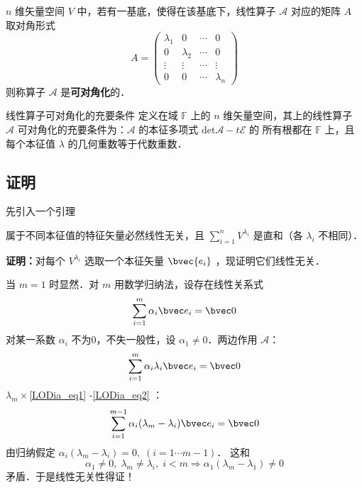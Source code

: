 \begin{definition}{}
 $n$ 维矢量空间 $V$ 中，若有一基底，使得在该基底下，线性算子 $\mathcal{A}$ 对应的矩阵 $A$ 取对角形式
 \begin{equation}
 A=\begin{pmatrix}
 \lambda_1&0&\cdots&0\\
 0&\lambda_2&\cdots&0\\
 \vdots&\vdots&\cdots&\vdots\\
 0&0&\cdots&\lambda_n
 \end{pmatrix}
 \end{equation}
 则称算子 $\mathcal{A}$ 是\textbf{可对角化}的．
\end{definition}
\begin{theorem}{线性算子可对角化的充要条件}\label{LODia_the1}
定义在域 $\mathbb{F}$ 上的 $n$ 维矢量空间，其上的线性算子 $\mathcal{A}$ 可对角化的充要条件为：$\mathcal{A}$ 的本征多项式 $\mathrm{det}{\mathcal{A}-t \mathcal{E}}$ 的 所有根都在 $\mathbb{F}$ 上，且每个本征值 $\lambda$ 的几何重数等于代数重数．
\end{theorem}
\subsection{证明}
先引入一个引理
\begin{lemma}{}
属于不同本征值的特征矢量必然线性无关，且 $\sum\limits_{i=1}^nV^{\lambda_i}$ 是直和（各 $\lambda_i$ 不相同）．
\end{lemma}
\textbf{证明：}对每个 $V^{\lambda_i}$ 选取一个本征矢量 $\bvec{e_i}$ ，现证明它们线性无关．

当 $m=1$ 时显然．对 $m$ 用数学归纳法，设存在线性关系式
\begin{equation}\label{LODia_eq1}
\sum_{i=1}^{m}\alpha_i\bvec e_i=\bvec 0
\end{equation}
对某一系数 $\alpha_i$ 不为0，不失一般性，设 $\alpha_1\neq0$．两边作用 $\mathcal A$：
\begin{equation}\label{LODia_eq2}
\sum_{i=1}^m\alpha_i\lambda_i\bvec e_i=\bvec 0
\end{equation}
$\lambda_m\times$\autoref{LODia_eq1} -\autoref{LODia_eq2} ：
\begin{equation}
\sum_{i=1}^{m-1}\alpha_i(\lambda_m-\lambda_i)\bvec e_i=\bvec 0
\end{equation}
由归纳假定 $\alpha_i(\lambda_m-\lambda_i)=0,\;(i=1\cdots m-1)$． 这和
\begin{equation}
\alpha_1\ne0,\;\lambda_m\neq\lambda_i,\;i<m\Rightarrow \alpha_1(\lambda
_m-\lambda_1)\neq0
\end{equation}
矛盾．于是线性无关性得证！

